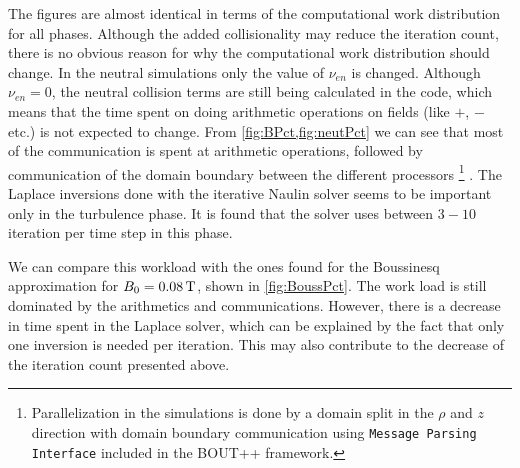 %
The figures are almost identical in terms of the computational work distribution for all phases.
Although the added collisionality may reduce the iteration count, there is no obvious reason for why the computational work distribution should change.
In the neutral simulations only the value of $\nu_{en}$ is changed.
Although $\nu_{en}=0$, the neutral collision terms are still being calculated in the code, which means that the time spent on doing arithmetic operations on fields (like $+$, $-$ etc.) is not expected to change.
From \cref{fig:BPct,fig:neutPct} we can see that most of the communication is spent at arithmetic operations, followed by communication of the domain boundary between the different processors%
\footnote{Parallelization in the simulations is done by a domain split in the $\rho$ and $z$ direction with domain boundary communication using \texttt{Message Parsing Interface} included in the BOUT++ framework.}%
.
The Laplace inversions done with the iterative Naulin solver seems to be important only in the turbulence phase.
It is found that the solver uses between $3-10$ iteration per time step in this phase.

We can compare this workload with the ones found for the Boussinesq approximation for $B_0=0.08\, \text{T}$, shown in \cref{fig:BoussPct}.
The work load is still dominated by the arithmetics and communications.
However, there is a decrease in time spent in the Laplace solver, which can be explained by the fact that only one inversion is needed per iteration.
This may also contribute to the decrease of the iteration count presented above.
